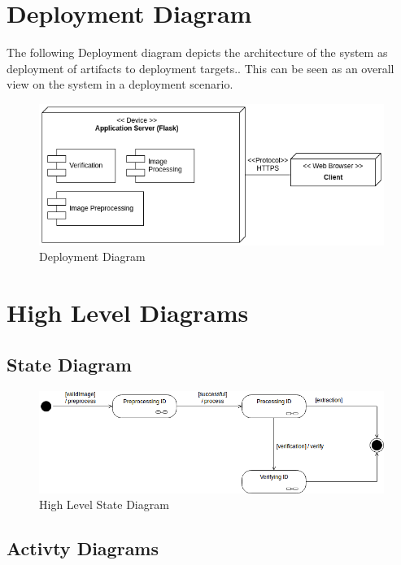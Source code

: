 \documentclass{article}
\begin{document}
\section{Deployment Diagram}
The following Deployment diagram depicts the architecture of the system as deployment of artifacts to deployment targets.. This can be seen as an overall view on the system in a deployment scenario.
\begin{figure}[h]
	    	\centering
	    	\includegraphics[scale=0.5]{img/Quant.png}
	    	\caption{Deployment Diagram}
	    \end{figure}
	    \pagebreak

\section{High Level Diagrams}

\subsection{State Diagram}
\begin{figure}[h]
	\centering
	\includegraphics[scale=0.5]{img/StateModelHighLevel.png}
	\caption{High Level State Diagram}
\end{figure}

\subsection{Activty Diagrams}
\end{document}
